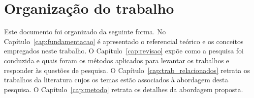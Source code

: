 \section{Organização do trabalho}

Este documento foi organizado da seguinte forma. No Capítulo~\ref{cap:fundamentacao} é apresentado o referencial teórico e os conceitos empregados neste trabalho. O Capítulo~\ref{cap:revisao} expõe como a pesquisa foi conduzida e quais foram os métodos aplicados para levantar os trabalhos e responder às questões de pesquisa. O Capítulo~\ref{cap:trab_relacionados} retrata os trabalhos da literatura cujos os temas estão associados à abordagem desta pesquisa. O Capítulo~\ref{cap:metodo} retrata os detalhes da abordagem proposta.